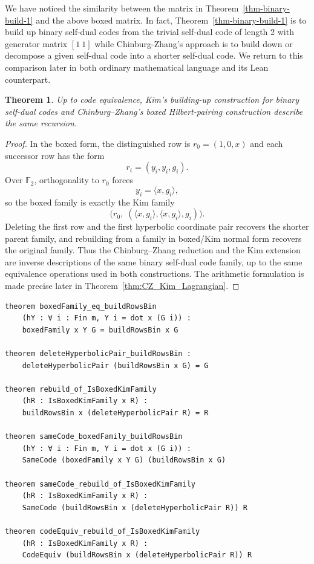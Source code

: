 \documentclass[12pt]{article}
\newtheorem{theorem}{Theorem}[section]
\newenvironment{blueblock}{\begingroup\color{blue}}{\endgroup}
\begin{document}
We have noticed the similarity between the matrix in Theorem~\ref{thm-binary-build-1} and the above boxed matrix. In fact, Theorem~\ref{thm-binary-build-1} is to build up binary self-dual codes from the trivial self-dual code of length 2 with generator matrix $[1~ 1]$ while Chinburg-Zhang's approach is to build down or decompose a given self-dual code into a shorter self-dual code.
We return to this comparison later in both ordinary mathematical language and its Lean counterpart.

\begin{blueblock}
\begin{theorem}\label{thm:binary-cz-kim}
Up to code equivalence, Kim's building-up construction for binary self-dual codes and Chinburg--Zhang's boxed Hilbert-pairing construction describe the same recursion.
\end{theorem}

\begin{proof}
In the boxed form, the distinguished row is $r_0=(1,0,x)$ and each successor row has the form
\[
r_i=(y_i,y_i,g_i).
\]
Over $\mathbb F_2$, orthogonality to $r_0$ forces
\[
y_i=\langle x,g_i\rangle,
\]
so the boxed family is exactly the Kim family
\[
\bigl(r_0,\;(\langle x,g_i\rangle,\langle x,g_i\rangle,g_i)\bigr).
\]
Deleting the first row and the first hyperbolic coordinate pair recovers the shorter parent family, and rebuilding from a family in boxed/Kim normal form recovers the original family. Thus the Chinburg--Zhang reduction and the Kim extension are inverse descriptions of the same binary self-dual code family, up to the same equivalence operations used in both constructions. The arithmetic formulation is made precise later in Theorem~\ref{thm:CZ_Kim_Lagrangian}.
\end{proof}

\begin{lstlisting}[caption={Lean bundle for Theorem~\ref{thm:binary-cz-kim}.}]
theorem boxedFamily_eq_buildRowsBin
    (hY : ∀ i : Fin m, Y i = dot x (G i)) :
    boxedFamily x Y G = buildRowsBin x G

theorem deleteHyperbolicPair_buildRowsBin :
    deleteHyperbolicPair (buildRowsBin x G) = G

theorem rebuild_of_IsBoxedKimFamily
    (hR : IsBoxedKimFamily x R) :
    buildRowsBin x (deleteHyperbolicPair R) = R

theorem sameCode_boxedFamily_buildRowsBin
    (hY : ∀ i : Fin m, Y i = dot x (G i)) :
    SameCode (boxedFamily x Y G) (buildRowsBin x G)

theorem sameCode_rebuild_of_IsBoxedKimFamily
    (hR : IsBoxedKimFamily x R) :
    SameCode (buildRowsBin x (deleteHyperbolicPair R)) R

theorem codeEquiv_rebuild_of_IsBoxedKimFamily
    (hR : IsBoxedKimFamily x R) :
    CodeEquiv (buildRowsBin x (deleteHyperbolicPair R)) R
\end{lstlisting}
\end{blueblock}
\end{document}
